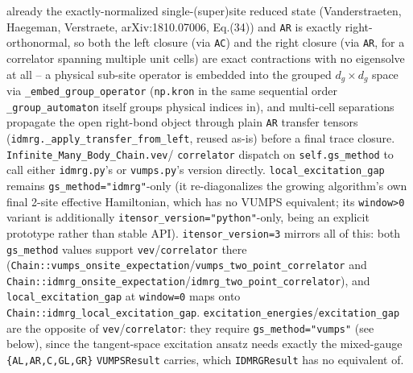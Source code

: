 \documentclass[11pt]{article}
\begin{document}
already the exactly-normalized single-(super)site reduced state
(Vanderstraeten, Haegeman, Verstraete, arXiv:1810.07006, Eq.(34)) and
\texttt{AR} is exactly right-orthonormal, so both the left closure (via
\texttt{AC}) and the right closure (via \texttt{AR}, for a correlator
spanning multiple unit cells) are exact contractions with no eigensolve
at all -- a physical sub-site operator is embedded into the grouped
$d_g \times d_g$ space via \texttt{\_embed\_group\_operator}
(\texttt{np.kron} in the same sequential order
\texttt{\_group\_automaton} itself groups physical indices in), and
multi-cell separations propagate the open right-bond object through
plain \texttt{AR} transfer tensors
(\texttt{idmrg.\_apply\_transfer\_from\_left}, reused as-is) before a
final trace closure. \texttt{Infinite\_Many\_Body\_Chain.vev}/
\texttt{correlator} dispatch on \texttt{self.gs\_method} to call either
\texttt{idmrg.py}'s or \texttt{vumps.py}'s version directly.
\texttt{local\_excitation\_gap} remains \texttt{gs\_method="idmrg"}-only
(it re-diagonalizes the growing algorithm's own final 2-site effective
Hamiltonian, which has no VUMPS equivalent; its \texttt{window>0}
variant is additionally \texttt{itensor\_version="python"}-only, being an
explicit prototype rather than stable API). \texttt{itensor\_version=3}
mirrors all of this: both \texttt{gs\_method} values support
\texttt{vev}/\texttt{correlator} there
(\texttt{Chain::vumps\_onsite\_expectation}/\texttt{vumps\_two\_point\_correlator}
and
\texttt{Chain::idmrg\_onsite\_expectation}/\texttt{idmrg\_two\_point\_correlator}),
and \texttt{local\_excitation\_gap} at \texttt{window=0} maps onto
\texttt{Chain::idmrg\_local\_excitation\_gap}.
\texttt{excitation\_energies}/\texttt{excitation\_gap} are the opposite of
\texttt{vev}/\texttt{correlator}: they require \texttt{gs\_method="vumps"}
(see below), since the tangent-space excitation ansatz needs exactly the
mixed-gauge \texttt{\{AL,AR,C,GL,GR\}} \texttt{VUMPSResult} carries, which
\texttt{IDMRGResult} has no equivalent of.
\end{document}
